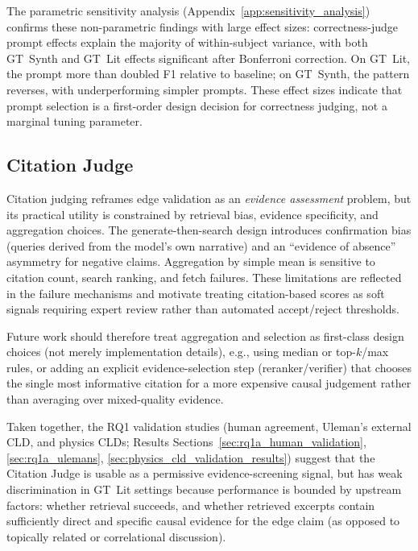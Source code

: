 The parametric sensitivity analysis (Appendix~\ref{app:sensitivity_analysis}) confirms these non-parametric findings with large effect sizes: correctness-judge prompt effects explain the majority of within-subject variance, with both GT~Synth and GT~Lit effects significant after Bonferroni correction. On GT~Lit, the \PromptMechanistic{} prompt more than doubled F1 relative to baseline; on GT~Synth, the pattern reverses, with \PromptMechanistic{} underperforming simpler prompts. These effect sizes indicate that prompt selection is a first-order design decision for correctness judging, not a marginal tuning parameter.

\subsection{Citation Judge}
\label{sec:discussion_citation_aggregation}
Citation judging reframes edge validation as an \emph{evidence assessment} problem, but its practical utility is constrained by retrieval bias, evidence specificity, and aggregation choices. The generate-then-search design introduces confirmation bias (queries derived from the model's own narrative) and an ``evidence of absence'' asymmetry for negative claims. Aggregation by simple mean is sensitive to citation count, search ranking, and fetch failures. These limitations are reflected in the failure mechanisms and motivate treating citation-based scores as soft signals requiring expert review rather than automated accept/reject thresholds.

Future work should therefore treat aggregation and selection as first-class design choices (not merely implementation details), e.g., using median or top-$k$/max rules, or adding an explicit evidence-selection step (reranker/verifier) that chooses the single most informative citation for a more expensive causal judgement rather than averaging over mixed-quality evidence.

Taken together, the RQ1 validation studies (human agreement, Uleman's external CLD, and physics CLDs; Results Sections~\ref{sec:rq1a_human_validation}, \ref{sec:rq1a_ulemans}, \ref{sec:physics_cld_validation_results}) suggest that the Citation Judge is usable as a permissive evidence-screening signal, but has weak discrimination in GT~Lit settings because performance is bounded by upstream factors: whether retrieval succeeds, and whether retrieved excerpts contain sufficiently direct and specific causal evidence for the edge claim (as opposed to topically related or correlational discussion).

